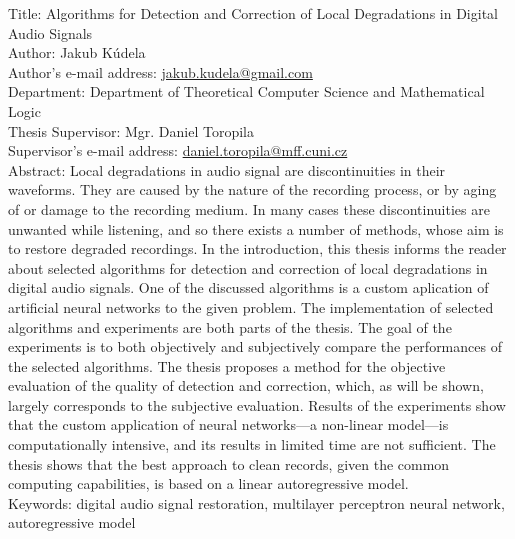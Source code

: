 
\nonfrenchspacing

\noindent
Title: Algorithms for Detection and Correction of Local Degradations in Digital Audio Signals\\
Author: Jakub Kúdela\\
Author's e-mail address: \url{jakub.kudela@gmail.com}\\
Department: Department of Theoretical Computer Science and Mathematical Logic\\
Thesis Supervisor: Mgr. Daniel Toropila\\
Supervisor's e-mail address: \url{daniel.toropila@mff.cuni.cz}\\

\noindent
Abstract: Local degradations in audio signal are discontinuities in their waveforms. They are caused by the nature of the recording process, or by aging of or damage to the recording medium. In many cases these discontinuities are unwanted while listening, and so there exists a number of methods, whose aim is to restore degraded recordings. In the introduction, this thesis informs the reader about selected algorithms for detection and correction of local degradations in digital audio signals. One of the discussed algorithms is a custom aplication of artificial neural networks to the given problem. The implementation of selected algorithms and experiments are both parts of the thesis. The goal of the experiments is to both objectively and subjectively compare the performances of the selected algorithms. The thesis proposes a method for the objective evaluation of the quality of detection and correction, which, as will be shown, largely corresponds to the subjective evaluation. Results of the experiments show that the custom application of neural networks---a non-linear model---is computationally intensive, and its results in limited time are not sufficient. The thesis shows that the best approach to clean records, given the common computing capabilities, is based on a linear autoregressive model.\\

\noindent
Keywords: digital audio signal restoration, multilayer perceptron neural network, autoregressive model

\frenchspacing